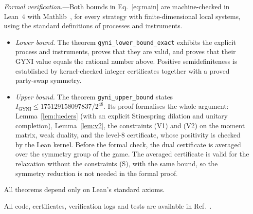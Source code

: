 \documentclass[aps,prl,twocolumn,superscriptaddress,longbibliography,nofootinbib]{revtex4-2}
\newcommand{\Igy}{I_{\mathrm{GYNI}}}
\begin{document}
\emph{Formal verification.}---Both bounds in Eq.~\eqref{eq:main} are machine-checked in Lean~4 with Mathlib~\cite{Lean4}, for every strategy with finite-dimensional local systems, using the standard definitions of processes and instruments.
\begin{itemize}
\item \emph{Lower bound.} The theorem \texttt{gyni\_lower\_bound\_exact} exhibits the explicit process and instruments, proves that they are valid, and proves that their GYNI value equals the rational number above. Positive semidefiniteness is established by kernel-checked integer certificates together with a proved party-swap symmetry.
\item \emph{Upper bound.} The theorem \texttt{gyni\_upper\_bound} states $\Igy\le175129158097837/2^{48}$. Its proof formalises the whole argument: Lemma~\ref{lem:lueders} (with an explicit Stinespring dilation and unitary completion), Lemma~\ref{lem:v2}, the constraints (V1) and (V2) on the moment matrix, weak duality, and the level-8 certificate, whose positivity is checked by the Lean kernel. Before the formal check, the dual certificate is averaged over the symmetry group of the game. The averaged certificate is valid for the relaxation without the constraints (S), with the same bound, so the symmetry reduction is not needed in the formal proof.
\end{itemize}
All theorems depend only on Lean's standard axioms.

All code, certificates, verification logs and tests are available in Ref.~\cite{repo}.


\end{document}
